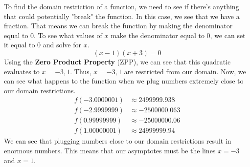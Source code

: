 \begin{solution}
    To find the domain restriction of a function, we need to see if there's anything that could potentially "break" the function. In this case, we see that we have a fraction. That means we can break the function by making the denominator equal to $0$. To see what values of $x$ make the denominator equal to $0$, we can set it equal to $0$ and solve for $x$.
    \[
        (x - 1)(x + 3) = 0
    \]\clearpage
    Using the \textbf{Zero Product Property} (ZPP), we can see that this quadratic evaluates to $x = -3, 1$. Thus, $x = -3, 1$ are restricted from our domain. Now, we can see what happens to the function when we plug numbers extremely close to our domain restrictions.
    \[
    \begin{aligned}
        f(-3.0000001) &\approx 2499999.938\\
        f(-2.9999999) &\approx -2500000.063\\
        f(0.99999999) &\approx -25000000.06\\
        f(1.00000001) &\approx 24999999.94
    \end{aligned}
    \]
    We can see that plugging numbers close to our domain restrictions result in enormous numbers. This means that our asymptotes must be the lines $x = -3$ and $x = 1$.

    \begin{center}
    \end{center}
    
\end{solution}

